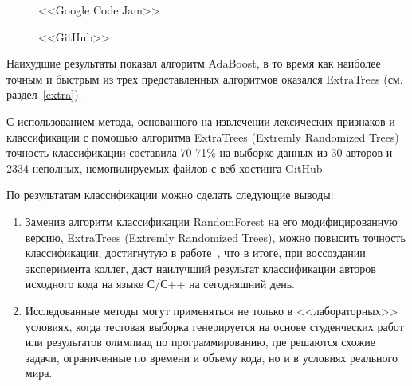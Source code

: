 \begin{figure}[h!]
\caption{ <<Google Code Jam>> }
\label{google:google}
\end{figure}

\begin{figure}[h!]
\caption{ <<GitHub>> }
\label{github:github}
\end{figure}

Наихудшие результаты показал алгоритм AdaBoost, в то время как наиболее точным и быстрым из трех 
представленных алгоритмов оказался ExtraTrees (см. раздел~\ref{extra}). 

С использованием метода, основанного на извлечении лексических признаков и классификации с помощью алгоритма 
ExtraTrees (Extremly Randomized Trees) точность классификации составила 70-71\% на выборке данных из 30 авторов
и 2334 неполных, немопилируемых файлов с веб-хостинга GitHub. 

По результатам классификации можно сделать следующие выводы:
\begin{enumerate}
 \item Заменив алгоритм классификации RandomForest
 на его модифицированную версию, ExtraTrees (Extremly Randomized Trees),
 можно повысить точность классификации, достигнутую в работе~\cite{git_blame},
 что в итоге, при воссоздании эксперимента коллег, даст наилучший результат классификации
 авторов исходного кода на языке С/С++ на сегодняшний день.
 \item Исследованные методы могут применяться не только в <<лабораторных>> условиях, когда
тестовая выборка генерируется на основе студенческих работ или результатов олимпиад по программированию,
где решаются схожие задачи, ограниченные по времени и объему кода, но и в условиях реального мира.
\end{enumerate}


\clearpage